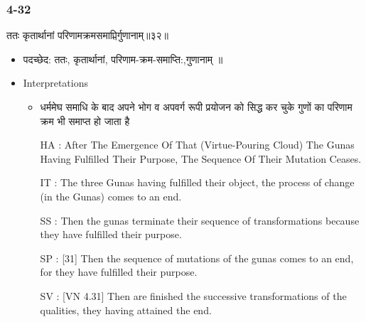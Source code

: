 \begin{frame}[fragile]\frametitle{4-32}
\begin{sanskrit}
ततः कृतार्थानां परिणामक्रमसमाप्तिर्गुणानाम्॥३२॥
\end{sanskrit}


	\begin{itemize}
	\item पदच्छेद:  ततः, कृतार्थानां, परिणाम-क्रम-समाप्ति:,गुणानाम् ॥
	\item Interpretations
		\begin{itemize}	
		\item धर्ममेघ समाधि के बाद अपने भोग  व अपवर्ग रूपी प्रयोजन को सिद्ध कर चुके गुणों का परिणाम क्रम भी समाप्त हो जाता है
		\item [HA]: After The Emergence Of That (Virtue-Pouring Cloud) The Gunas Having Fulfilled Their Purpose, The Sequence Of Their Mutation Ceases.
		\item [IT]: The three Gunas having fulfilled their object, the process of change (in the Gunas) comes to an end.
		\item [SS]: Then the gunas terminate their sequence of transformations because they have fulfilled their purpose.
		\item [SP]: [31] Then the sequence of mutations of the gunas comes to an end, for they have fulfilled their purpose.
		\item [SV]: [VN 4.31] Then are finished the successive transformations of the qualities, they having attained the end. 
		\end{itemize}
	\end{itemize}
\end{frame}


